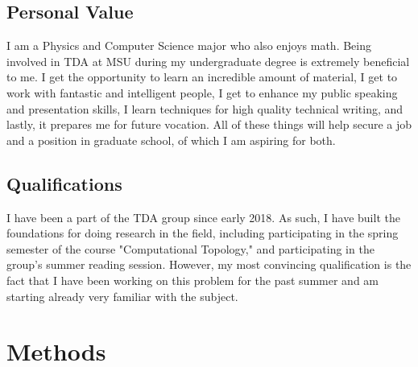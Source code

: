 \documentclass[12pt]{article}
\begin{document}
\subsection{Personal Value}
I am a Physics and Computer Science major who also enjoys math. Being involved in TDA at MSU during my undergraduate degree is extremely beneficial to me. I get the opportunity to learn an incredible amount of material, I get to work with fantastic and intelligent people, I get to enhance my public speaking and presentation skills, I learn techniques for high quality technical writing, and lastly, it prepares me for future vocation. All of these things will help secure a job and a position in graduate school, of which I am aspiring for both. 
\subsection{Qualifications}
I have been a part of the TDA group since early 2018. As such, I have built the foundations for doing research in the field, including participating in the spring semester of the course "Computational Topology," and participating in the group's summer reading session. However, my most convincing qualification is the fact that I have been working on this problem for the past summer and am starting already very familiar with the subject.


\section{Methods}
\end{document}
